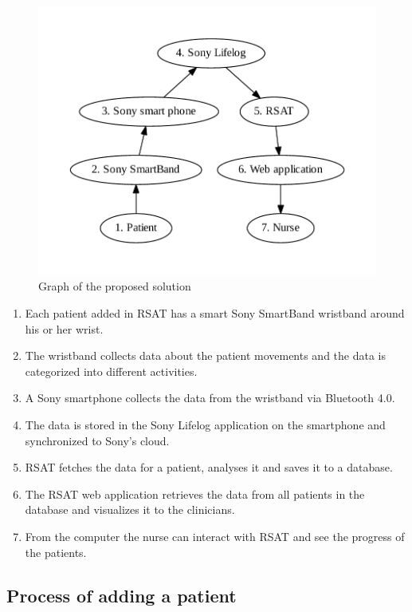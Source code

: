 \documentclass{cslthse-msc}
\begin{document}
\begin{figure}[!hbt]
\centering
\includegraphics[scale=0.8]{proposed.pdf} 
\caption{Graph of the proposed solution}\label{fig:pro}
\end{figure}


\begin{enumerate}
    \item Each patient added in RSAT has a smart Sony SmartBand wristband around his or her wrist.
    \item The wristband collects data about the patient movements and the data is categorized into different activities.
    \item A Sony smartphone collects the data from the wristband via Bluetooth 4.0. 
    \item The data is stored in the Sony Lifelog application on the smartphone and synchronized to Sony's cloud.
    \item RSAT fetches the data for a patient, analyses it and saves it to a database.
\item The RSAT web application retrieves the data from all patients in the database and visualizes it to the clinicians.
\item From the computer the nurse can interact with RSAT and see the progress of the patients. 
\end{enumerate}

\subsection{Process of adding a patient}
\end{document}
